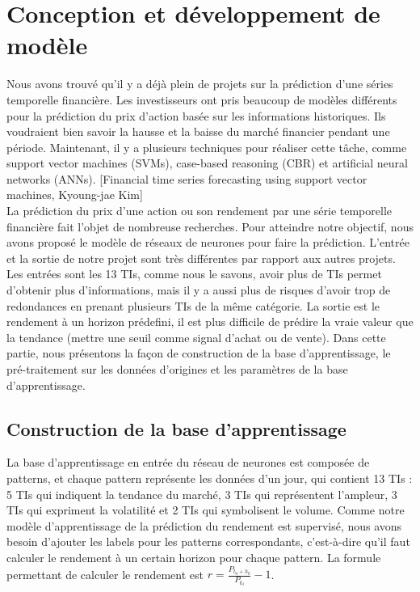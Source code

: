 

\section{Conception et développement de modèle}

Nous avons trouvé qu’il y a déjà plein de projets sur la prédiction d’une séries temporelle financière. Les investisseurs ont pris beaucoup de modèles différents pour la prédiction du prix d'action basée sur les informations historiques. Ils voudraient bien savoir la hausse et la baisse du marché financier pendant une période. Maintenant, il y a plusieurs techniques pour réaliser cette tâche, comme support vector machines (SVMs), case-based reasoning (CBR) et artificial neural networks (ANNs). [Financial time series forecasting using support vector machines, Kyoung-jae Kim] \\

La prédiction du prix d'une action ou son rendement par une série temporelle financière fait l'objet de nombreuse recherches. Pour atteindre notre objectif, nous avons proposé le modèle de réseaux de neurones pour faire la prédiction. L’entrée et la sortie de notre projet sont très différentes par rapport aux autres projets. Les entrées sont les 13 TIs, comme nous le savons, avoir plus de TIs permet d'obtenir plus d’informations, mais il y a aussi plus de risques d’avoir trop de redondances en prenant plusieurs TIs de la même catégorie. La sortie est le rendement à un horizon prédefini, il est plus difficile de prédire la vraie valeur que la tendance (mettre une seuil comme signal d’achat ou de vente). Dans cette partie, nous présentons la façon de construction de la base d'apprentissage, le pré-traitement sur les données d'origines et les paramètres de la base d'apprentissage. 

\subsection{Construction de la base d’apprentissage}

La base d'apprentissage en entrée du réseau de neurones est composée de patterns, et chaque pattern représente les données d'un jour, qui contient 13 TIs : 5 TIs qui indiquent la tendance du marché, 3 TIs qui représentent l'ampleur, 3 TIs qui expriment la volatilité et 2 TIs qui symbolisent le volume. Comme notre modèle d'apprentissage de la prédiction du rendement est supervisé, nous avons besoin d’ajouter les labels pour les patterns correspondants, c’est-à-dire qu'il faut calculer le rendement à un certain horizon pour chaque pattern. La formule permettant de calculer le rendement est $ r = \frac{P_{t_{0}+h_{0}}}{P_{t_{0}}} - 1 $.


